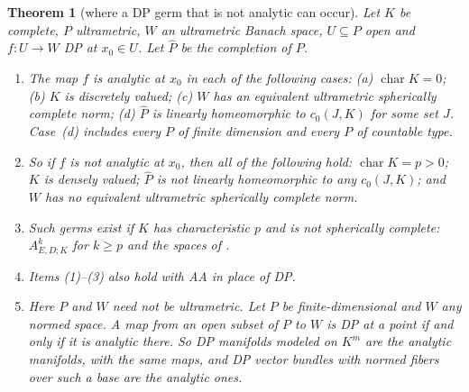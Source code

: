 \documentclass[11pt]{amsart}
\newtheorem{theorem}{Theorem}[section]
\theoremstyle{definition}
\theoremstyle{remark}
\numberwithin{equation}{section}
\theoremstyle{plain}
\theoremstyle{definition}
\theoremstyle{plain}
\begin{document}
\begin{theorem}[where a DP germ that is not analytic can occur]\label{dp:thm:conservativity}
Let $K$ be complete, $P$ ultrametric, $W$ an ultrametric Banach space, $U\subseteq P$ open and $f\colon U\to W$ DP at $x_0\in U$. Let $\widehat P$ be the completion of $P$.
\begin{enumerate}
\item The map $f$ is analytic at $x_0$ in each of the following cases: \textup{(a)} $\operatorname{char}K=0$; \textup{(b)} $K$ is discretely valued; \textup{(c)} $W$ has an equivalent ultrametric spherically complete norm; \textup{(d)} $\widehat P$ is linearly homeomorphic to $c_0(J,K)$ for some set $J$. Case~\textup{(d)} includes every $P$ of finite dimension and every $P$ of countable type.
\item So if $f$ is not analytic at $x_0$, then all of the following hold: $\operatorname{char}K=p>0$; $K$ is densely valued; $\widehat P$ is not linearly homeomorphic to any $c_0(J,K)$; and $W$ has no equivalent ultrametric spherically complete norm.
\item Such germs exist if $K$ has characteristic $p$ and is not spherically complete: $A^k_{E,D;K}$ for $k\ge p$ and the spaces of \cite[Theorem~7.2(2)]{I}.
\item Items \textup{(1)}--\textup{(3)} also hold with AA in place of DP.
\item Here $P$ and $W$ need not be ultrametric. Let $P$ be finite-dimensional and $W$ any normed space. A map from an open subset of $P$ to $W$ is DP at a point if and only if it is analytic there. So DP manifolds modeled on $K^m$ are the analytic manifolds, with the same maps, and DP vector bundles with normed fibers over such a base are the analytic ones.
\end{enumerate}
\end{theorem}
\end{document}
